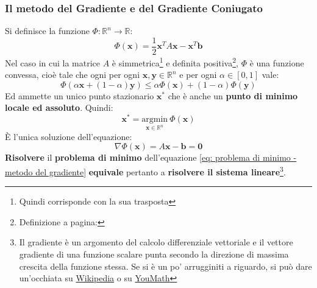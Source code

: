\newpage

\subsubsection{Il metodo del Gradiente e del Gradiente Coniugato}

Si definisce la funzione $\varPhi: \mathbb{R}^{n} \rightarrow \mathbb{R}$:
\begin{equation}
    \varPhi\left(\mathbf{x}\right) = \dfrac{1}{2}\mathbf{x}^{T} A \mathbf{x} - \mathbf{x}^{T}\mathbf{b}
\end{equation}
Nel caso in cui la matrice $A$ è simmetrica\footnote{Quindi corrisponde con la sua trasposta} e definita positiva\footnote{Definizione a pagina: \pageref{matrice definita positiva}}, $\varPhi$ è una funzione convessa, cioè tale che ogni per ogni $\mathbf{x}, \mathbf{y} \in \mathbb{R}^{n}$ e per ogni $\alpha \in \left[0,1\right]$ vale:
\begin{equation}
    \varPhi\left(
        \alpha\mathbf{x} + \left(1-\alpha\right) \mathbf{y}
    \right)
    \le
    \alpha\varPhi\left(\mathbf{x}\right) + \left(1-\alpha\right)\varPhi\left(\mathbf{y}\right)
\end{equation}
Ed ammette un unico punto stazionario $\mathbf{x}^{*}$ che è anche un \textbf{punto di minimo locale ed assoluto}. Quindi:
\begin{equation}\label{eq: problema di minimo - metodo del gradiente}
    \mathbf{x}^{*} = \underset{\mathbf{x} \in \mathbb{R}^{n}}{\mathrm{argmin}} \: \varPhi\left(\mathbf{x}\right)
\end{equation}
È l'unica soluzione dell'equazione:
\begin{equation}\label{eq: direzione massima crescita}
    \nabla\varPhi\left(\mathbf{x}\right) = A\mathbf{x} - \mathbf{b} = \mathbf{0}
\end{equation}
\textbf{Risolvere} il \textbf{problema di minimo} dell'equazione \ref{eq: problema di minimo - metodo del gradiente} \textbf{equivale} pertanto a \textbf{risolvere il sistema lineare}\footnote{Il gradiente è un argomento del calcolo differenziale vettoriale e il vettore gradiente di una funzione scalare punta secondo la direzione di massima crescita della funzione stessa. Se si è un po' arrugginiti a riguardo, si può dare un'occhiata su \href{https://it.wikipedia.org/wiki/Gradiente}{Wikipedia} o su \href{https://www.youmath.it/lezioni/analisi-due/varie/2275-gradiente.html}{YouMath}}.

